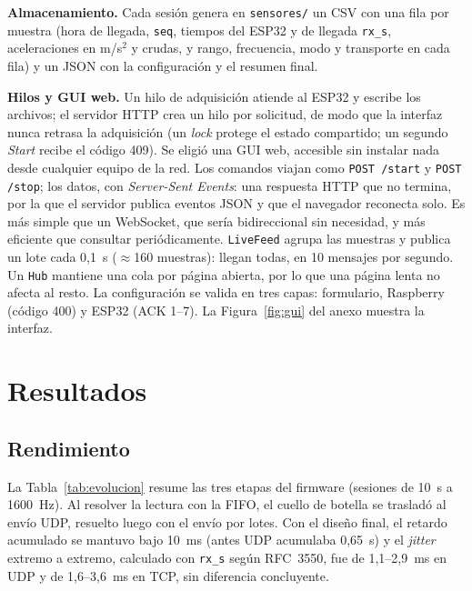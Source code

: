 \documentclass[11pt,a4paper]{report}
\begin{document}
\textbf{Almacenamiento.} Cada sesión genera en \texttt{sensores/} un CSV con una fila por muestra (hora de llegada, \texttt{seq}, tiempos del ESP32 y de llegada \texttt{rx\_s}, aceleraciones en m/s$^2$ y crudas, y rango, frecuencia, modo y transporte en cada fila) y un JSON con la configuración y el resumen final.

\textbf{Hilos y GUI web.} Un hilo de adquisición atiende al ESP32 y escribe los archivos; el servidor HTTP crea un hilo por solicitud, de modo que la interfaz nunca retrasa la adquisición (un \textit{lock} protege el estado compartido; un segundo \textit{Start} recibe el código 409). Se eligió una GUI web, accesible sin instalar nada desde cualquier equipo de la red. Los comandos viajan como \texttt{POST /start} y \texttt{POST /stop}; los datos, con \textit{Server-Sent Events}: una respuesta HTTP que no termina, por la que el servidor publica eventos JSON y que el navegador reconecta solo. Es más simple que un WebSocket, que sería bidireccional sin necesidad, y más eficiente que consultar periódicamente. \texttt{LiveFeed} agrupa las muestras y publica un lote cada 0,1~s ($\approx$160 muestras): llegan todas, en 10 mensajes por segundo. Un \texttt{Hub} mantiene una cola por página abierta, por lo que una página lenta no afecta al resto. La configuración se valida en tres capas: formulario, Raspberry (código 400) y ESP32 (ACK 1--7). La Figura~\ref{fig:gui} del anexo muestra la interfaz.

\chapter{Resultados}\label{cap:resultados}
\section{Rendimiento}
La Tabla~\ref{tab:evolucion} resume las tres etapas del firmware (sesiones de 10~s a 1600~Hz). Al resolver la lectura con la FIFO, el cuello de botella se trasladó al envío UDP, resuelto luego con el envío por lotes. Con el diseño final, el retardo acumulado se mantuvo bajo 10~ms (antes UDP acumulaba 0,65~s) y el \textit{jitter} extremo a extremo, calculado con \texttt{rx\_s} según RFC~3550, fue de 1,1--2,9~ms en UDP y de 1,6--3,6~ms en TCP, sin diferencia concluyente.
\end{document}
